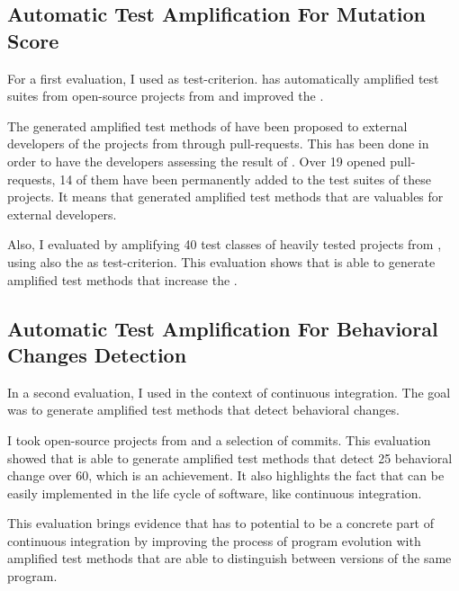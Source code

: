 \subsection{Automatic Test Amplification For Mutation Score}
\label{subsec:conclusion:contributions-summary:test-ampl-ms}

For a first evaluation, I used \ms as test-criterion.
\dspot has automatically amplified test suites from open-source projects from \gh and improved the \ms.

The generated amplified test methods of \dspot have been proposed to external developers of the projects from \gh through pull-requests.
This has been done in order to have the developers assessing the result of \dspot.
Over 19 opened pull-requests, 14 of them have been permanently added to the test suites of these projects.
It means that \dspot generated amplified test methods that are valuables for external developers.

Also, I evaluated \dspot by amplifying 40 test classes of heavily tested projects from \gh, using also the \ms as test-criterion.
This evaluation shows that \dspot is able to generate amplified test methods that increase the \ms.

\subsection{Automatic Test Amplification For Behavioral Changes Detection}
\label{subsec:conclusion:contributions-summary:behavioral-change-detection}

In a second evaluation, I used \dspot in the context of continuous integration.
The goal was to generate amplified test methods that detect behavioral changes.

I took open-source projects from \gh and a selection of commits.
This evaluation showed that \dspot is able to generate amplified test methods that detect 25 behavioral change over 60, which is an achievement.
It also highlights the fact that \dspot can be easily implemented in the life cycle of software, like continuous integration.

This evaluation brings evidence that \dspot has to potential to be a concrete part of continuous integration by improving the process of program evolution with amplified test methods that are able to distinguish between versions of the same program.

